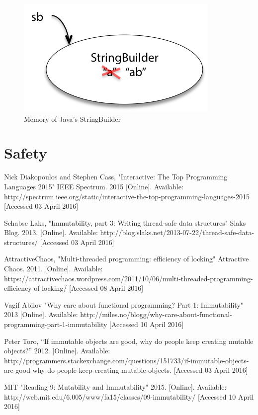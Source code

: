 \documentclass[11pt]{article}
\begin{document}
\begin{figure}[H]
\centering

\includegraphics{string_builder}
\caption{Memory of Java's StringBuilder \cite{mit_reading_9}}

\end{figure}

\section{Safety}
\clearpage

\begin{thebibliography}{9}

  Nick Diakopoulos and Stephen Cass,
  "Interactive: The Top Programming Languages 2015"
  IEEE Spectrum.
  2015
  [Online].
  Available: http://spectrum.ieee.org/static/interactive-the-top-programming-languages-2015
  [Accessed 03 April 2016]

  Schabse Laks,
  "Immutability, part 3: Writing thread-safe data structures"
  Slaks Blog.
  2013.
  [Online].
  Available: http://blog.slaks.net/2013-07-22/thread-safe-data-structures/
  [Accessed 03 April 2016]

  AttractiveChaos,
  "Multi-threaded programming: efficiency of locking"
  Attractive Chaos.
  2011.
  [Online].
  Available: https://attractivechaos.wordpress.com/2011/10/06/multi-threaded-programming-efficiency-of-locking/
  [Accessed 08 April 2016]

	Vagif Abilov
	"Why care about functional programming? Part 1: Immutability"
	2013
	[Online].
	Available: http://miles.no/blogg/why-care-about-functional-programming-part-1-immutability
	[Accessed 10 April 2016]

	Peter Toro,
	“If immutable objects are good, why do people keep creating mutable objects?”
	2012.
	[Online].
	Available: http://programmers.stackexchange.com/questions/151733/if-immutable-objects-are-good-why-do-people-keep-creating-mutable-objects.
	[Accessed 03 April 2016]

	MIT
	"Reading 9: Mutability and Immutability"
	2015.
	[Online].
	Available: http://web.mit.edu/6.005/www/fa15/classes/09-immutability/
	[Accessed 10 April 2016]

\end{thebibliography}
\end{document}
